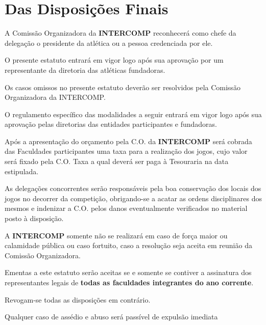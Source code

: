 {\let\clearpage\relax \chapter{Das Disposições Finais}}

\begin{article}
	A Comissão Organizadora da \textbf{INTERCOMP} reconhecerá como chefe da delegação o presidente da atlética ou a pessoa credenciada por ele.
\end{article}

\begin{article}
	O presente estatuto entrará em vigor logo após sua aprovação por um representante da diretoria das atléticas fundadoras.
\end{article}

\begin{article}
	Os casos omissos no presente estatuto deverão ser resolvidos pela Comissão Organizadora da INTERCOMP.
\end{article}

\begin{article}
	O regulamento específico das modalidades a seguir entrará em vigor logo após sua aprovação pelas diretorias das entidades participantes e fundadoras.
\end{article}

\begin{article}
	Após a apresentação do orçamento pela C.O. da \textbf{INTERCOMP} será cobrada das Faculdades participantes uma taxa para a realização dos jogos, cujo valor será fixado pela C.O. Taxa a qual deverá ser paga à Tesouraria na data estipulada.
\end{article}

\begin{article}
	As delegações concorrentes serão responsáveis pela boa conservação dos locais dos jogos no decorrer da competição, obrigando-se a acatar as ordens disciplinares dos mesmos e indenizar a C.O. pelos danos eventualmente verificados no material posto à disposição.
\end{article}

\begin{article}
	A \textbf{INTERCOMP} somente não se realizará em caso de força maior ou calamidade pública ou caso fortuito, caso a resolução seja aceita em reunião da Comissão Organizadora.
\end{article}

\begin{article}
	Ementas a este estatuto serão aceitas se e somente se contiver a assinatura dos representantes legais de \textbf{todas as faculdades integrantes do ano corrente}.
\end{article}

\begin{article}
	Revogam-se todas as disposições em contrário.
\end{article}

\begin{article}
    Qualquer caso de assédio e abuso será passível de expulsão imediata
\end{article}

